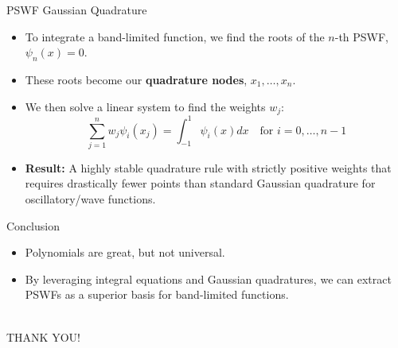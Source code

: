 \documentclass[10pt]{beamer}
\begin{document}
\begin{frame}{PSWF Gaussian Quadrature}
    \begin{itemize}
        \item To integrate a band-limited function, we find the roots of the $n$-th PSWF, $\psi_n(x) = 0$.
        \item These roots become our \textbf{quadrature nodes}, $x_1, \dots, x_n$.
        \item We then solve a linear system to find the weights $w_j$:
        $$ \sum_{j=1}^{n} w_j \psi_i(x_j) = \int_{-1}^{1} \psi_i(x) dx \quad \text{for } i = 0, \dots, n-1 $$
        \item \textbf{Result:} A highly stable quadrature rule with strictly positive weights that requires drastically fewer points than standard Gaussian quadrature for oscillatory/wave functions.
    \end{itemize}
\end{frame}

\begin{frame}{Conclusion}
    \begin{itemize}
        \item Polynomials are great, but not universal. 
        \item By leveraging integral equations and Gaussian quadratures, we can extract PSWFs as a superior basis for band-limited functions.
    \end{itemize}
\end{frame}

\begin{frame}
\centering
\begin{Huge}
\phantom{h}\\
THANK YOU!
\end{Huge}
\end{frame}
\end{document}
